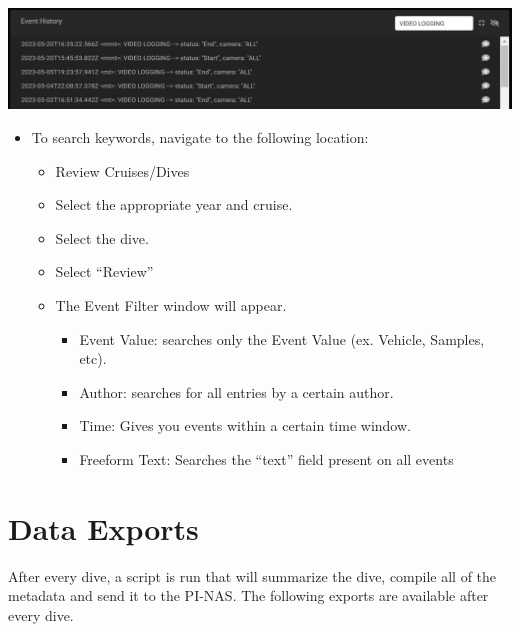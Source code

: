 \documentclass[
  letterpaper,
  DIV=11,
  numbers=noendperiod]{scrreprt}
\providecommand{\tightlist}{%
  \setlength{\itemsep}{0pt}\setlength{\parskip}{0pt}}\usepackage{longtable,booktabs,array}
\begin{document}
\includegraphics{images/image3.png}

\begin{itemize}
\tightlist
\item
  To search keywords, navigate to the following location:

  \begin{itemize}
  \tightlist
  \item
    Review Cruises/Dives
  \item
    Select the appropriate year and cruise.
  \item
    Select the dive.
  \item
    Select ``Review''
  \item
    The Event Filter window will appear.

    \begin{itemize}
    \tightlist
    \item
      Event Value: searches only the Event Value (ex. Vehicle, Samples,
      etc).
    \item
      Author: searches for all entries by a certain author.
    \item
      Time: Gives you events within a certain time window.
    \item
      Freeform Text: Searches the ``text'' field present on all events
    \end{itemize}
  \end{itemize}
\end{itemize}

\hypertarget{data-exports}{%
\section{Data Exports}\label{data-exports}}

After every dive, a script is run that will summarize the dive, compile
all of the metadata and send it to the PI-NAS. The following exports are
available after every dive.
\end{document}
